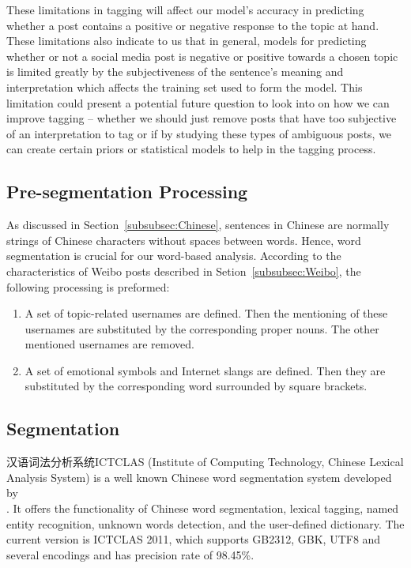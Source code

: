 \documentclass[11pt]{article}
\newcommand{\1}[1]{{\mathbf 1}\left\{#1\right\}}        %
\begin{document}
These limitations in tagging will affect our model's accuracy in predicting whether a post contains a positive or negative response to the topic at hand.  These limitations also indicate to us that in general, models for predicting whether or not a social media post is negative or positive towards a chosen topic is limited greatly by the subjectiveness of the sentence's meaning and interpretation which affects the training set used to form the model. This limitation could present a potential future question to look into on how we can improve tagging -- whether we should just remove posts that have too subjective of an interpretation to tag or if by studying these types of ambiguous posts, we can create certain priors or statistical models to help in the tagging process. 



\subsection{Pre-segmentation Processing}

As discussed in Section~\ref{subsubsec:Chinese}, sentences in Chinese are normally strings of Chinese characters without spaces between words. Hence, word segmentation is crucial for our word-based analysis. According to the characteristics of Weibo posts described in Setion~\ref{subsubsec:Weibo}, the following processing is preformed:
\begin{enumerate}
\item A set of topic-related usernames are defined.  Then the mentioning of these usernames are substituted by the corresponding proper nouns. The other mentioned usernames are removed.
\item A set of emotional symbols and Internet slangs are defined.  Then they are substituted by the corresponding word surrounded by square brackets.
\end{enumerate}

	

\subsection{Segmentation}

汉语词法分析系统ICTCLAS (Institute of Computing Technology, Chinese Lexical Analysis System) is a well known Chinese word segmentation system developed by 
\\ \cite{ICTCLAS}. It offers the functionality of  Chinese word segmentation, lexical tagging, named entity recognition, unknown words detection, and the user-defined dictionary. 
The current version is ICTCLAS 2011, which supports GB2312, GBK, UTF8 and several encodings and has precision rate of 98.45\%. 
\end{document}
